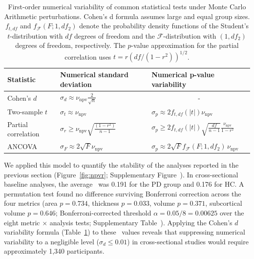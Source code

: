 \begin{table}[ht]
    \centering
    \begin{tabular}{lll}
        \toprule
        \textbf{Statistic}
                                                        & \textbf{Numerical standard deviation}                 &
        \textbf{Numerical p-value variability}
        \\
        \midrule
        Cohen's $d$                                     & $\sigma_d
        \approx\nu_{\mathrm{npv}}\frac{2}{\sqrt{n}}$    &
        \multicolumn{1}{c}{-}
        \\
        Two-sample $t$                                  & $\sigma_t \approx \nu_{\mathrm{npv}}        $
                                                        & $\sigma_{p} \approx 2f_{t,df}(|t|)\nu_{\mathrm{npv}}$
        \\
        Partial correlation                             & $\sigma_r \geq
        \nu_{\mathrm{npv}}\sqrt{\frac{(1-r^{2})}{n-1}}$ & $\sigma_{p} \geq
        2f_{t,df}(|t|)\sqrt{\frac{df}{n-1}}\frac{\nu_{\mathrm{npv}}}{1-r^2}$                                      \\
        ANCOVA                                          & $\sigma_F \approx 2\sqrt{F}\nu_{\mathrm{npv}}$
                                                        & $\sigma_{p} \approx
        2\sqrt{F}f_{\mathcal{F}}(F;1,df_2)\,{\nu_{\mathrm{npv}}}$                                                 \\
        \bottomrule
    \end{tabular}
    \caption{First-order numerical variability of common statistical tests under
    Monte Carlo Arithmetic perturbations. Cohen's d formula assumes large and
    equal group sizes. $f_{t,df}$ and $f_\mathcal{F}(F;1,df_2)$ denote the
    probability density functions of the Student's $t$-distribution with $df$
    degrees of freedom and the $\mathcal{F}$-distribution with $(1, df_2)$
    degrees of freedom, respectively. The $p$-value approximation for the
    partial correlation uses
    $t=r{(df/(1-r^2))}^{1/2}$.\label{tab:stat_uncertainty}}
\end{table}

We applied this model to quantify the stability of the analyses reported in the
previous section (Figure~\ref{fig:npvr}; Supplementary
Figure~). In cross-sectional baseline
analyses, the average \npvr\ was 0.191 for the PD group and 0.176 for HC. A
permutation test found no difference surviving Bonferroni correction across
the four metrics (area $p=0.734$, thickness $p=0.033$, volume $p=0.371$,
subcortical volume $p=0.646$; Bonferroni-corrected threshold
$\alpha=0.05/8=0.00625$ over the eight metric $\times$ analysis tests;
Supplementary Table~). Applying the Cohen's
$d$ variability formula (Table~\ref{tab:stat_uncertainty}) to these \npvr\
values reveals that suppressing numerical variability to a negligible level
($\sigma_d \leq 0.01$) in cross-sectional studies would require approximately
1,340 participants.

